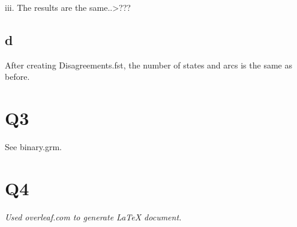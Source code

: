 \documentclass[12pt, letterpaper]{article}
\begin{document}
iii. The results are the same..>???

\subsection{d}

After creating Disagreements.fst, the number of states and arcs is the same as before. 

\section{Q3}
See binary.grm.

\section{Q4}



\begin{center}
\textit{Used overleaf.com to generate LaTeX document.}
\end{center}
\end{document}
